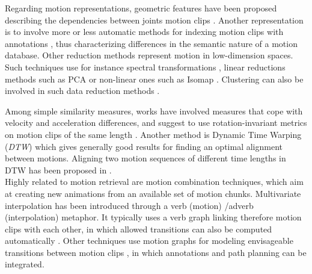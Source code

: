 
Regarding motion representations, geometric features have been proposed describing the dependencies between joints motion clips . Another representation is to involve more or less automatic methods for indexing motion clips with annotations , thus characterizing differences in the semantic nature of a motion database. Other reduction methods represent motion in low-dimension spaces. Such techniques use for instance spectral transformations , linear reductions methods such as PCA  or non-linear ones such as Isomap . Clustering can also be involved in such data reduction methods .

Among simple similarity measures, works have involved measures that cope with velocity and acceleration differences, and suggest to use rotation-invariant metrics on motion clips of the same length . Another method is Dynamic Time Warping (\emph{DTW}) which gives generally good results  for finding an optimal alignment between motions. Aligning two motion sequences of different time lengths in DTW has been proposed in .\\

Highly related to motion retrieval are motion combination techniques, which aim at creating new animations from an available set of motion chunks. Multivariate interpolation has been introduced  through a verb (motion) /adverb (interpolation) metaphor. It typically uses a verb graph linking therefore motion clips with each other, in which allowed transitions can also be computed automatically . Other techniques use motion graphs for modeling envisageable transitions between motion clips , in which annotations  and path planning  can be integrated.\\ %

